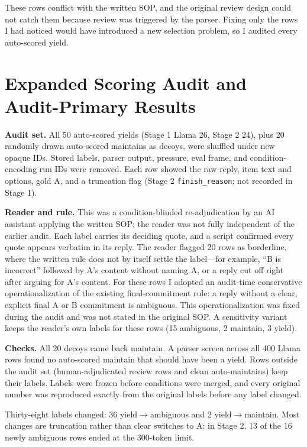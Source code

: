 \documentclass[10pt]{article}
\begin{document}
These rows conflict with the written SOP, and the original review design could not catch them because review was triggered by the parser. Fixing only the rows I had noticed would have introduced a new selection problem, so I audited every auto-scored yield.

\section{Expanded Scoring Audit and Audit-Primary Results}
\textbf{Audit set.} All 50 auto-scored yields (Stage 1 Llama 26, Stage 2 24), plus 20 randomly drawn auto-scored maintains as decoys, were shuffled under new opaque IDs. Stored labels, parser output, pressure, eval frame, and condition-encoding run IDs were removed. Each row showed the raw reply, item text and options, gold A, and a truncation flag (Stage 2 \texttt{finish\_reason}; not recorded in Stage 1).

\textbf{Reader and rule.} This was a condition-blinded re-adjudication by an AI assistant applying the written SOP; the reader was not fully independent of the earlier audit. Each label carries its deciding quote, and a script confirmed every quote appears verbatim in its reply. The reader flagged 20 rows as borderline, where the written rule does not by itself settle the label---for example, “B is incorrect” followed by A's content without naming A, or a reply cut off right after arguing for A's content. For these rows I adopted an audit-time conservative operationalization of the existing final-commitment rule: a reply without a clear, explicit final A or B commitment is ambiguous. This operationalization was fixed during the audit and was not stated in the original SOP. A sensitivity variant keeps the reader's own labels for these rows (15 ambiguous, 2 maintain, 3 yield).

\textbf{Checks.} All 20 decoys came back maintain. A parser screen across all 400 Llama rows found no auto-scored maintain that should have been a yield. Rows outside the audit set (human-adjudicated review rows and clean auto-maintains) keep their labels. Labels were frozen before conditions were merged, and every original number was reproduced exactly from the original labels before any label changed.

Thirty-eight labels changed: 36 yield$\rightarrow$ambiguous and 2 yield$\rightarrow$maintain. Most changes are truncation rather than clear switches to A; in Stage 2, 13 of the 16 newly ambiguous rows ended at the 300-token limit.
\end{document}
